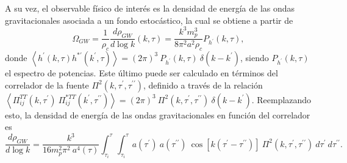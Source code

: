 A su vez, el observable físico de interés es la densidad de energía de las ondas gravitacionales asociada a un fondo estocástico, la cual se obtiene a partir de \cite{Caprini_2020}
\begin{equation}
    \Omega_{GW} = \frac{1}{\rho_c} \frac{d \rho_{GW}}{d \log k} \left( k, \tau \right) = \frac{k^3 m_p^3}{8 \pi^2 a^2 \rho_c} P_{h^{\prime}} \left( k, \tau \right),
\end{equation}
donde $\displaystyle \left\langle h^\prime \left( k, \tau \right) h^{*\prime} \left( k^\prime, \tau \right) \right\rangle = (2 \pi)^3 ~ P_{h^{\prime}} \left( k, \tau \right) ~ \delta \left( k - k^\prime \right)$, siendo $P_{h^\prime} \left( k, \tau \right)$ el espectro de potencias. Este último puede ser calculado en términos del correlador de la fuente $\displaystyle \Pi^2 \left( k, \tau^\prime, \tau^{\prime\prime} \right)$, definido a través de la relación $\displaystyle \left\langle \Pi^{TT}_{ij} \left( k, \tau^\prime \right) ~ \Pi^{*TT}_{ij} \left( k^\prime, \tau^{\prime \prime} \right) \right\rangle = (2 \pi)^3 ~ \Pi^2 \left( k, \tau^\prime, \tau^{\prime \prime} \right) ~ \delta \left( k - k^\prime \right)$. Reemplazando esto, la densidad de energía de las ondas gravitacionales en función del correlador es
\begin{equation}
    \frac{d \rho_{GW}}{d \log k} = \frac{k^3}{16 m_p^2 \pi^2 ~ a^4 (\tau)} \int_{\tau_i}^{\tau} \int_{\tau_i}^{\tau} a \left( \tau^\prime \right) ~ a \left( \tau^{\prime \prime} \right) ~ \cos \left[ k \left( \tau^\prime - \tau^{\prime \prime} \right) \right] ~ \Pi^2 \left( k, \tau^\prime, \tau^{\prime \prime} \right) ~ d \tau^\prime ~ d \tau^{\prime \prime}.
\end{equation}

